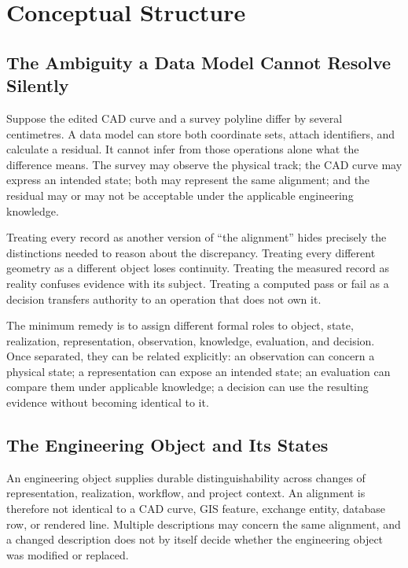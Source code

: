 
\chapter{Conceptual Structure}
\label{chap:conceptual-structure}

\section{The Ambiguity a Data Model Cannot Resolve Silently}

Suppose the edited CAD curve and a survey polyline differ by several
centimetres. A data model can store both coordinate sets, attach identifiers,
and calculate a residual. It cannot infer from those operations alone what the
difference means. The survey may observe the physical track; the CAD curve may
express an intended state; both may represent the same alignment; and the
residual may or may not be acceptable under the applicable engineering
knowledge.

Treating every record as another version of ``the alignment'' hides precisely
the distinctions needed to reason about the discrepancy. Treating every
different geometry as a different object loses continuity. Treating the measured
record as reality confuses evidence with its subject. Treating a computed pass
or fail as a decision transfers authority to an operation that does not own it.

The minimum remedy is to assign different formal roles to object, state,
realization, representation, observation, knowledge, evaluation, and decision.
Once separated, they can be related explicitly: an observation can concern a
physical state; a representation can expose an intended state; an evaluation
can compare them under applicable knowledge; a decision can use the resulting
evidence without becoming identical to it.

\section{The Engineering Object and Its States}

An engineering object supplies durable distinguishability across changes of
representation, realization, workflow, and project context. An alignment is
therefore not identical to a CAD curve, GIS feature, exchange entity, database
row, or rendered line. Multiple descriptions may concern the same alignment,
and a changed description does not by itself decide whether the engineering
object was modified or replaced.

